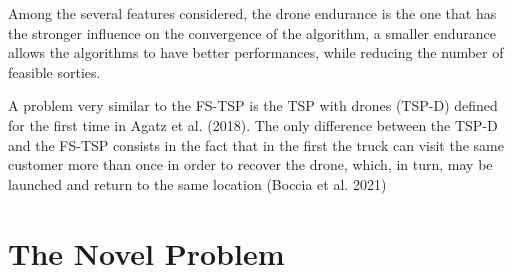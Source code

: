 \documentclass{article}
\begin{document}
	
	
	
	Among the several features considered, the drone endurance is the one that
	has the stronger influence on the convergence of the algorithm, a smaller endurance
	allows the algorithms to have better performances, while reducing the number of
	feasible sorties.
	\par 
	A problem very similar to the FS-TSP is the TSP with drones (TSP-D) defined for the first time in Agatz et al. (2018). The only
	difference between the TSP-D and the FS-TSP consists in the fact that in the first the truck can visit the same customer more than once in
	order to recover the drone, which, in turn, may be launched and return to the same location (Boccia et al. 2021)
	\section{The Novel Problem}
	
\end{document}
